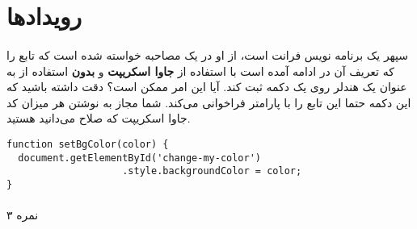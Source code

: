 \documentclass[../main.tex]{subfiles}
\begin{document}
\section{رویدادها}

\paragraph{}
سپهر یک برنامه نویس فرانت است، از او در یک مصاحبه خواسته شده است
که تابع 
را که تعریف آن در ادامه آمده است با استفاده از \textbf{جاوا اسکریپت}
و \textbf{بدون}
استفاده از 
به عنوان یک هندلر روی یک دکمه ثبت کند. آیا این امر ممکن است؟
دقت داشته باشید که این دکمه حتما این تابع را با پارامتر 
فراخوانی می‌کند.
شما مجاز به نوشتن هر میزان کد جاوا اسکریپت که صلاح می‌دانید هستید.

\begin{latin}
\begin{verbatim}
function setBgColor(color) {
  document.getElementById('change-my-color')
                    .style.backgroundColor = color;
}
\end{verbatim}
\end{latin}

\paragraph{}
۳ نمره
\end{document}
